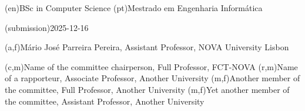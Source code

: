 \ntauthordegree(en){BSc in Computer Science}
\ntauthordegree(pt){Mestrado em Engenharia Informática}

\ntdate(submission){2025-12-16}

(a,f){Mário José Parreira Pereira, Assistant Professor, NOVA University Lisbon}

(c,m){Name of the committee chairperson, Full Professor, FCT-NOVA}
(r,m){Name of a rapporteur, Associate Professor, Another University}
(m,f){Another member of the committee, Full Professor, Another University}
(m,f){Yet another member of the committee, Assistant Professor, Another University}
